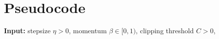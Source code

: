 \documentclass{article}
\begin{document}
\section*{Pseudocode}
\begin{algorithm}[H]
\caption{Clipped Gradient Descent with Momentum (CGDM)}
\begin{algorithmic}[1]
\STATE \textbf{Input:} stepsize $\eta>0$, momentum $\beta\in[0,1)$, clipping threshold $C>0$,
\STATE \quad\quad\quad\quad\quad\quad\quad\quad\quad\quad\quad\quad\quad\quad\quad\quad\quad\quad\quad\quad\quad\quad\quad\quad\quad\quad\quad\quad\quad\quad\quad\quad\quad\quad\quad\quad\quad\quad\quad\quad\quad\quad\quad\quad\quad\quad\quad\quad\quad\quad\quad\quad\quad\quad\quad\quad\quad\quad\quad\quad\quad\quad\quad\quad\quad\quad\quad\quad\quad\quad\quad\quad\quad\quad\quad\quad\quad\quad\quad\quad\quad\quad\quad\quad\quad\quad\quad\quad\quad\quad\quad\quad\quad\quad\quad\quad\quad\quad\quad\quad\quad\quad\quad\quad\quad\quad\quad\quad\quad\quad\quad\quad\quad\quad\quad\quad\quad\quad\quad\quad\quad\quad\quad\quad\quad\quad\quad\quad\quad\quad\quad\quad\quad\quad\quad\quad\quad\quad\quad\quad\quad\quad\quad\quad\quad\quad\quad\quad\quad\quad\quad\quad\quad\quad\quad\quad\quad\quad\quad\quad\quad\quad\quad\quad\quad\quad\quad\quad\quad\quad\quad\quad\quad\quad\quad\quad\quad\quad\quad\quad\quad\quad\quad\quad\quad\quad\quad\quad\quad\quad\quad\quad\quad\quad\quad\quad\quad\quad\quad\quad\quad\quad\quad\quad\quad\quad\quad\quad\quad\quad\quad\quad\quad\quad\quad\quad\quad\quad\quad\quad\quad\quad\quad\quad\quad\quad\quad\quad\quad\quad\quad\quad\quad\quad\quad\quad\quad\quad\quad\quad\quad\quad\quad\quad\quad\quad\quad\quad\quad\quad\quad\quad\quad\quad\quad\quad\quad\quad\quad\quad\quad\quad\quad\quad\quad\quad\quad\quad\quad\quad\quad\quad\quad\quad\quad\quad\quad\quad\quad\quad\quad\quad\quad\quad\quad\quad\quad\quad\quad\quad\quad\quad\quad\quad\quad\quad\quad\quad\quad\quad\quad\quad\quad\quad\quad\quad\quad\quad\quad\quad\quad\quad\quad\quad\quad\quad\quad\quad\quad\quad\quad\quad\quad\quad\quad\quad\quad\quad\quad\quad\quad\quad\quad\quad\quad\quad\quad\quad\quad\quad\quad\quad\quad\quad\quad\quad\quad\quad\quad\quad\quad\quad\quad\quad\quad\quad\quad\quad\quad\quad\quad\quad\quad\quad\quad\quad\quad\quad\quad\quad\quad\quad\quad\quad\quad\quad\quad\quad\quad\quad\quad\quad\quad\quad\quad\quad\quad\quad\quad\quad\quad\quad\quad\quad\quad\quad\quad\quad\quad\quad\quad\quad\quad\quad\quad\quad\quad\quad\quad\quad\quad\quad\quad\quad\quad\quad\quad\quad\quad\quad\quad\quad\quad\quad\quad\quad\quad\quad\quad\quad\quad\quad\quad\quad\quad\quad\quad\quad\quad\quad\quad\quad\quad\quad\quad\quad\quad\quad\quad\quad\quad\quad\quad\quad\quad\quad\quad\quad\quad\quad\quad\quad\quad\quad\quad\quad\quad\quad\quad\quad\quad\quad\quad\quad\quad\quad\quad\quad\quad\quad\quad\quad\quad\quad\quad\quad\quad\quad\quad\quad\quad\quad\quad\quad\quad\quad\quad\quad\quad\quad\quad\quad\quad\quad\quad\quad\quad\quad\quad\quad\quad\quad\quad\quad\quad\quad\quad\quad\quad\quad\quad\quad\quad\quad\quad\quad\quad\quad\quad\quad\quad\quad\quad\quad\quad\quad\quad\quad\quad\quad\quad\quad\quad\quad\quad\quad\quad\quad\quad\quad\quad\quad\quad\quad\quad\quad\quad\quad\quad\quad\quad\quad\quad\quad\quad\quad\quad\quad\quad\quad\quad\quad\quad
\end{algorithmic}
\end{algorithm}
\end{document}
